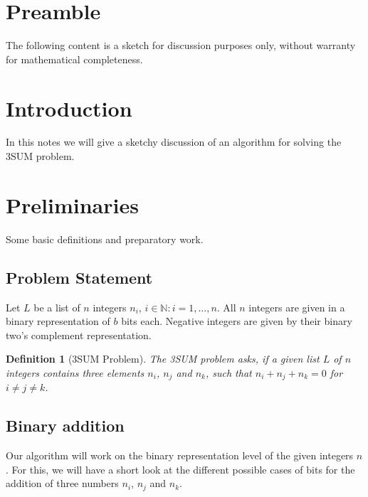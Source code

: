 \documentclass{article}
\newtheorem*{theorem A}{Theorem A}
\newtheorem*{theorem B}{N\"olker's Theorem}
\newtheorem{definition}{Definition}
\theoremstyle{remark}
\theoremstyle{remark}
\begin{document}
\section*{Preamble}
\label{s:preamble}
The following content is a sketch for discussion purposes only, without warranty for mathematical completeness.
\section{Introduction}
\label{s:introduction}
In this notes we will give a sketchy discussion of an algorithm for solving the 3SUM problem.
\section{Preliminaries}
\label{s:preliminaries}
Some basic definitions and preparatory work.
\subsection{Problem Statement}
\label{ss:problemstatement}
Let $L$ be a list of $n$ integers $n_{i}$, $i \in \mathbb{N}: i = 1,\dots, n$. All $n$ integers are given in a binary representation of $b$ bits each. Negative integers are given by their binary two's complement representation.

\begin{definition}[3SUM Problem]
    The 3SUM problem asks, if a given list $L$ of $n$ integers contains three elements $n_{i}$, $n_{j}$ and $n_{k}$, such that $n_{i} + n_{j} + n_{k} = 0$ for $i \neq j \neq k$.
\label{def:3sumproblem}
\end{definition}
\subsection{Binary addition}
\label{ss:binaryaddition}
Our algorithm will work on the binary representation level of the given integers $n$. For this, we will have a short look at the different possible cases of bits for the addition of three numbers $n_{i}$, $n_{j}$ and $n_{k}$.\\
\end{document}
